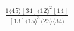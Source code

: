 \documentclass[varwidth, border=5pt]{standalone}
\begin{document}
\begin{my}
$\begin{gathered}
\scriptscriptstyle\frac{1⟨45⟩[34]⟨12⟩^2[14]}{[13]⟨15⟩^3⟨23⟩⟨34⟩}
\end{gathered}$
\end{my}
\end{document}
